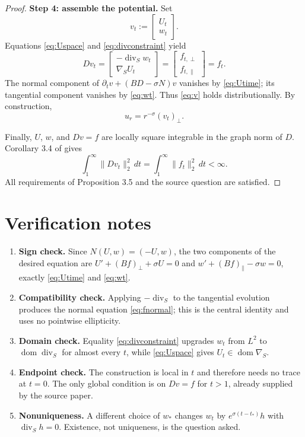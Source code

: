 \documentclass[11pt]{article}
\newcommand{\Div}{\operatorname{div}_{S}}
\newcommand{\grad}{\nabla_{S}}
\newcommand{\dom}{\operatorname{dom}}
\begin{document}
\begin{proof}
\medskip
\noindent\textbf{Step 4: assemble the potential.}
Set
\[
 v_t:=\begin{bmatrix}U_t\\w_t\end{bmatrix}.
\]
Equations \eqref{eq:Uspace} and \eqref{eq:divconstraint} yield
\[
 Dv_t=\begin{bmatrix}-\Div w_t\\ \grad U_t\end{bmatrix}
 =\begin{bmatrix}f_{t,\perp}\\f_{t,\parallel}\end{bmatrix}=f_t.
\]
The normal component of $\partial_tv+(BD-\sigma N)v$ vanishes by \eqref{eq:Utime}; its tangential component vanishes by \eqref{eq:wt}. Thus \eqref{eq:v} holds distributionally. By construction,
\[
 u_r=r^{-\sigma}(v_t)_\perp.
\]

Finally, $U$, $w$, and $Dv=f$ are locally square integrable in the graph norm of $D$. Corollary 3.4 of \cite{AR} gives
\[
 \int_1^\infty\|Dv_t\|_2^2\,dt
 =\int_1^\infty\|f_t\|_2^2\,dt<\infty.
\]
All requirements of Proposition 3.5 and the source question are satisfied.
\end{proof}

\section{Verification notes}

\begingroup\small
\begin{enumerate}[leftmargin=*]
\item \textbf{Sign check.} Since $N(U,w)=(-U,w)$, the two components of the desired equation are $U'+(Bf)_\perp+\sigma U=0$ and $w'+(Bf)_\parallel-\sigma w=0$, exactly \eqref{eq:Utime} and \eqref{eq:wt}.
\item \textbf{Compatibility check.} Applying $-\Div$ to the tangential evolution produces the normal equation \eqref{eq:fnormal}; this is the central identity and uses no pointwise ellipticity.
\item \textbf{Domain check.} Equality \eqref{eq:divconstraint} upgrades $w_t$ from $L^2$ to $\dom\Div$ for almost every $t$, while \eqref{eq:Uspace} gives $U_t\in\dom\grad$.
\item \textbf{Endpoint check.} The construction is local in $t$ and therefore needs no trace at $t=0$. The only global condition is on $Dv=f$ for $t>1$, already supplied by the source paper.
\item \textbf{Nonuniqueness.} A different choice of $w_*$ changes $w_t$ by $e^{\sigma(t-t_*)}h$ with $\Div h=0$. Existence, not uniqueness, is the question asked.
\end{enumerate}
\end{document}
